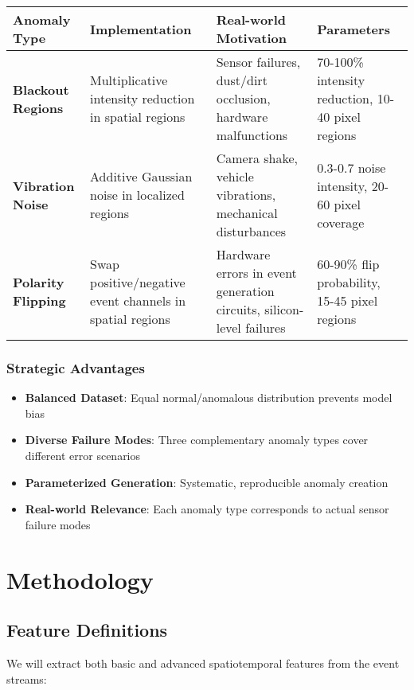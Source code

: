 \documentclass[12pt,a4paper]{article}
\begin{document}
\begin{longtable}{|p{3cm}|p{4cm}|p{4cm}|p{3cm}|}
\hline
\textbf{Anomaly Type} & \textbf{Implementation} & \textbf{Real-world Motivation} & \textbf{Parameters} \\
\hline
\textbf{Blackout Regions} & Multiplicative intensity reduction in spatial regions & Sensor failures, dust/dirt occlusion, hardware malfunctions & 70-100\% intensity reduction, 10-40 pixel regions \\
\hline
\textbf{Vibration Noise} & Additive Gaussian noise in localized regions & Camera shake, vehicle vibrations, mechanical disturbances & 0.3-0.7 noise intensity, 20-60 pixel coverage \\
\hline
\textbf{Polarity Flipping} & Swap positive/negative event channels in spatial regions & Hardware errors in event generation circuits, silicon-level failures & 60-90\% flip probability, 15-45 pixel regions \\
\hline
\end{longtable}

\subsubsection{Strategic Advantages}

\begin{itemize}
    \item \textbf{Balanced Dataset}: Equal normal/anomalous distribution prevents model bias
    \item \textbf{Diverse Failure Modes}: Three complementary anomaly types cover different error scenarios
    \item \textbf{Parameterized Generation}: Systematic, reproducible anomaly creation
    \item \textbf{Real-world Relevance}: Each anomaly type corresponds to actual sensor failure modes
\end{itemize}

\section{Methodology}

\subsection{Feature Definitions}

We will extract both basic and advanced spatiotemporal features from the event streams:
\end{document}

